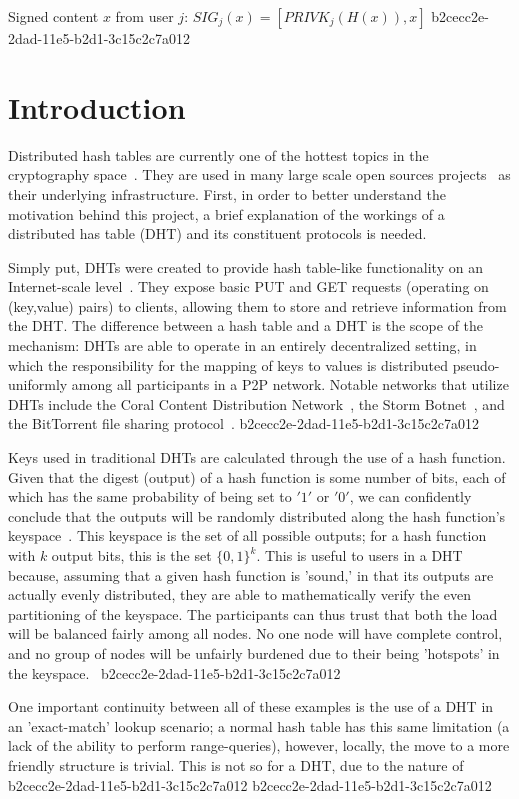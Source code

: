 \documentclass[12pt]{article}
\begin{document}
Signed content $x$ from user $j$: $SIG_j(x) = \left[ PRIVK_j( H(x) ), x \right]$
b2cecc2e-2dad-11e5-b2d1-3c15c2c7a012
\section{Introduction}
\par Distributed hash tables are currently one of the hottest topics in the cryptography space~\cite{Stoica:2001dj,Rowstron:2001ea,Ratnasamy:2001wn}. They are used in many large scale open sources projects~\cite{Freitas:2013tb,Xu:2010vs,Perfitt:2010fh} as their underlying infrastructure. First, in order to better understand the motivation behind this project, a brief explanation of the workings of a distributed has table (DHT) and its constituent protocols is needed.

\par Simply put, DHTs were created to provide hash table-like functionality on an Internet-scale level~\cite{Ratnasamy:2001wn}. They expose basic PUT and GET requests (operating on (key,value) pairs) to clients, allowing them to store and retrieve information from the DHT. The difference between a hash table and a DHT is the scope of the mechanism: DHTs are able to operate in an entirely decentralized setting, in which the responsibility for the mapping of keys to values is distributed pseudo-uniformly among all participants in a P2P network. Notable networks that utilize DHTs include the Coral Content Distribution Network~\cite{Freedman:2004vb}, the Storm Botnet~\cite{Holz:2008uk}, and the BitTorrent file sharing protocol~\cite{Cohen:y1_8mBnw}.
b2cecc2e-2dad-11e5-b2d1-3c15c2c7a012
\par Keys used in traditional DHTs are calculated through the use of a hash function. Given that the digest (output) of a hash function is some number of bits, each of which has the same probability of being set to $'1'$ or $'0'$, we can confidently conclude that the outputs will be randomly distributed along the hash function's keyspace~. This keyspace is the set of all possible outputs; for a hash function with $k$ output bits, this is the set $\{0,1\}^k$. This is useful to users in a DHT because, assuming that a given hash function is 'sound,' in that its outputs are actually evenly distributed, they are able to mathematically verify the even partitioning of the keyspace. The participants can thus trust that both the load will be balanced fairly among all nodes. No one node will have complete control, and no group of nodes will be unfairly burdened due to their being 'hotspots' in the keyspace.~
b2cecc2e-2dad-11e5-b2d1-3c15c2c7a012
\par One important continuity between all of these examples is the use of a DHT in an 'exact-match' lookup scenario; a normal hash table has this same limitation (a lack of the ability to perform range-queries), however, locally, the move to a more friendly structure is trivial. This is not so for a DHT, due to the nature of
b2cecc2e-2dad-11e5-b2d1-3c15c2c7a012\printbibliography
b2cecc2e-2dad-11e5-b2d1-3c15c2c7a012
\end{document}
